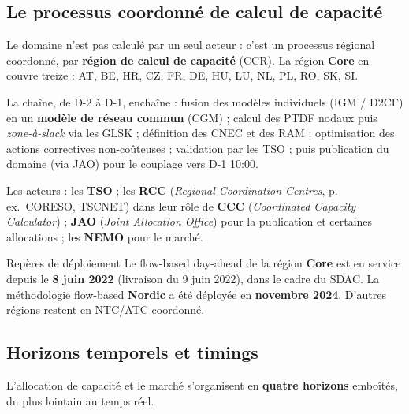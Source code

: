 \documentclass[11pt,a4paper]{article}
\begin{document}
\subsection{Le processus coordonné de calcul de capacité}

Le domaine n'est pas calculé par un seul acteur : c'est un processus régional
coordonné, par \textbf{région de calcul de capacité} (CCR). La région
\textbf{Core} en couvre treize : AT, BE, HR, CZ, FR, DE, HU, LU, NL, PL, RO,
SK, SI.

La chaîne, de D-2 à D-1, enchaîne : fusion des modèles individuels (IGM /
D2CF) en un \textbf{modèle de réseau commun} (CGM) ; calcul des PTDF nodaux
puis \emph{zone-à-slack} via les GLSK ; définition des CNEC et des RAM ;
optimisation des actions correctives non-coûteuses ; validation par les TSO ;
puis publication du domaine (via JAO) pour le couplage vers D-1 10:00.

Les acteurs : les \textbf{TSO} ; les \textbf{RCC} (\emph{Regional Coordination
Centres}, p.\,ex.\ CORESO, TSCNET) dans leur rôle de \textbf{CCC}
(\emph{Coordinated Capacity Calculator}) ; \textbf{JAO} (\emph{Joint Allocation
Office}) pour la publication et certaines allocations ; les \textbf{NEMO} pour
le marché.

\begin{rembox}{Repères de déploiement}
Le flow-based day-ahead de la région \textbf{Core} est en service depuis le
\textbf{8 juin 2022} (livraison du 9 juin 2022), dans le cadre du SDAC. La
méthodologie flow-based \textbf{Nordic} a été déployée en \textbf{novembre
2024}. D'autres régions restent en NTC/ATC coordonné.
\end{rembox}

\subsection{Horizons temporels et timings}

L'allocation de capacité et le marché s'organisent en \textbf{quatre
horizons} emboîtés, du plus lointain au temps réel.
\end{document}
